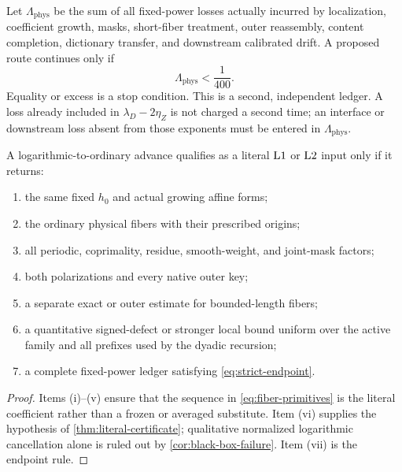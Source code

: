 \begin{definition}
\label{def:strict-endpoint}
Let \(\Lambda_{\mathrm{phys}}\) be the sum of all fixed-power losses
actually incurred by localization, coefficient growth, masks,
short-fiber treatment, outer reassembly, content completion,
dictionary transfer, and downstream calibrated drift.  A proposed
route continues only if
\begin{equation}
 \boxed{\qquad \Lambda_{\mathrm{phys}}<\frac1{400}. \qquad}
\label{eq:strict-endpoint}
\end{equation}
Equality or excess is a stop condition.
This is a second, independent ledger.  A loss already included in
\(\lambda_D-2\eta_Z\) is not charged a second time; an interface or
downstream loss absent from those exponents must be entered in
\(\Lambda_{\mathrm{phys}}\).
\end{definition}

\begin{proposition}
\label{prop:success-checklist}
A logarithmic-to-ordinary advance qualifies as a literal \(\mathrm{L1}\)
or \(\mathrm{L2}\) input only if it returns:
\begin{enumerate}[label=\textup{(\roman*)},leftmargin=2.5em]
 \item the same fixed \(h_0\) and actual growing affine forms;
 \item the ordinary physical fibers with their prescribed origins;
 \item all periodic, coprimality, residue, smooth-weight, and
 joint-mask factors;
 \item both polarizations and every native outer key;
 \item a separate exact or outer estimate for bounded-length fibers;
 \item a quantitative signed-defect or stronger local bound uniform
 over the active family and all prefixes used by the dyadic
 recursion;
 \item a complete fixed-power ledger satisfying
 \eqref{eq:strict-endpoint}.
\end{enumerate}
\end{proposition}

\begin{proof}
Items (i)--(v) ensure that the sequence in
\eqref{eq:fiber-primitives} is the literal coefficient rather than a
frozen or averaged substitute.  Item (vi) supplies the hypothesis of
\cref{thm:literal-certificate}; qualitative normalized logarithmic
cancellation alone is ruled out by
\cref{cor:black-box-failure}.  Item (vii) is the endpoint rule.
\end{proof}
